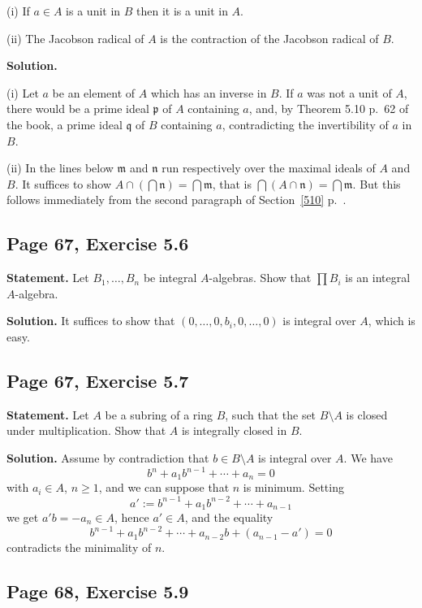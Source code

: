 \documentclass[parskip=half,fontsize=12pt]{scrartcl}%
\newcommand{\mf}{\mathfrak}
\newcommand{\mmm}{\mf m}
\newcommand{\nnn}{\mf n}
\newcommand{\ppp}{\mf p}
\newcommand{\qqq}{\mf q}
\begin{document}
(i) If $a\in A$ is a unit in $B$ then it is a unit in $A$.

(ii) The Jacobson radical of $A$ is the contraction of the Jacobson radical of $B$. 

\textbf{Solution.} 

(i) Let $a$ be an element of $A$ which has an inverse in $B$. If $a$ was not a unit of $A$, there would be a prime ideal $\ppp$ %
of $A$ containing $a$, and, by Theorem 5.10 p.~62 of the book, a prime ideal $\qqq$ of $B$ containing $a$, %
contradicting the invertibility of $a$ in $B$. 

(ii) In the lines below $\mmm$ and $\nnn$ run respectively over the maximal ideals of $A$ and $B$. It suffices to show $A\cap(\bigcap\nnn)=\bigcap\mmm$, that is $\bigcap(A\cap\nnn)=\bigcap\mmm$. But this follows immediately from the second paragraph of Section~\ref{510} p.~\pageref{510}. 

\subsection{Page 67, Exercise 5.6}%

\textbf{Statement.} Let $B_1,\ldots,B_n$ be integral $A$-algebras. Show that $\prod B_i$ is an integral $A$-algebra.

\textbf{Solution.} It suffices to show that $(0,\dots,0,b_i,0,\dots,0)$ is integral over $A$, which is easy. 

\subsection{Page 67, Exercise 5.7}%

\textbf{Statement.} Let $A$ be a subring of a ring $B$, such that the set $B\setminus A$ is closed under multiplication. Show that $A$ is integrally closed in $B$.

\textbf{Solution.} Assume by contradiction that $b\in B\setminus A$ is integral over $A$. We have 
$$
b^n+a_1b^{n-1}+\cdots+a_n=0
$$ 
with $a_i\in A$, $n\ge1$, and we can suppose that $n$ is minimum. Setting 
$$
a':=b^{n-1}+a_1b^{n-2}+\cdots+a_{n-1}
$$
we get $a'b=-a_n\in A$, hence $a'\in A$, and the equality 
$$
b^{n-1}+a_1b^{n-2}+\cdots+a_{n-2}b+(a_{n-1}-a')=0
$$ 
contradicts the minimality of $n$. 

\subsection{Page 68, Exercise 5.9}%
\end{document}
